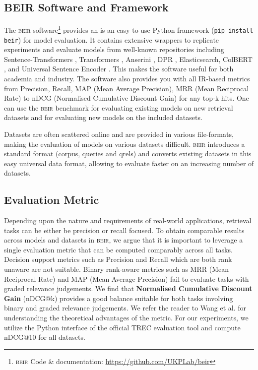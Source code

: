 \documentclass{article}
\newcommand{\custo}[1]{\textsc{\normalsize #1}}
\newcommand{\beir}{\custo{beir}\xspace}
\begin{document}
\vspace{-2mm}
\subsection{BEIR Software and Framework}
\vspace{-1mm}

The \beir software\footnote{\beir Code \& documentation: \href{https://github.com/UKPLab/beir}{https://github.com/UKPLab/beir}} provides an is an easy to use Python framework (\texttt{pip install beir}) for model evaluation. It contains extensive wrappers to replicate experiments and evaluate models from well-known repositories including Sentence-Transformers \cite{reimers-2019-sentence-bert}, Transformers \cite{wolf-etal-2020-transformers}, Anserini \cite{10.1145/3077136.3080721}, DPR \cite{karpukhin-etal-2020-dense}, Elasticsearch, ColBERT \cite{10.1145/3397271.3401075}, and Universal Sentence Encoder \cite{yang2020multilingual}. This makes the software useful for both academia and industry. The software also provides you with all IR-based metrics from Precision, Recall, MAP (Mean Average Precision), MRR (Mean Reciprocal Rate) to nDCG (Normalised Cumulative Discount Gain) for any top-k hits. One can use the \beir benchmark for evaluating existing models on new retrieval datasets and for evaluating new models on the included datasets.

Datasets are often scattered online and are provided in various file-formats, making the evaluation of models on various datasets difficult. \beir introduces a standard format (corpus, queries and qrels) and converts existing datasets in this easy universal data format, allowing to evaluate faster on an increasing number of datasets. 

\vspace{-2mm}
\subsection{Evaluation Metric}\label{sec:evaluation_metric}
\vspace{-1mm}

Depending upon the nature and requirements of real-world applications, retrieval tasks can be either be precision or recall focused. To obtain comparable results across models and datasets in \beir, we argue that it is important to leverage a single evaluation metric that can be computed comparably across all tasks. Decision support metrics such as Precision and Recall which are both rank unaware are not suitable. Binary rank-aware metrics such as MRR (Mean Reciprocal Rate) and MAP (Mean Average Precision) fail to evaluate tasks with graded relevance judgements. We find that \textbf{Normalised Cumulative Discount Gain} (nDCG@k) provides a good balance suitable for both tasks involving binary and graded relevance judgements. We refer the reader to Wang et al. \cite{wang2013theoretical} for understanding the theoretical advantages of the metric. For our experiments, we utilize the Python interface of the official TREC evaluation tool \cite{VanGysel2018pytreceval} and compute nDCG@10 for all datasets.
\end{document}
